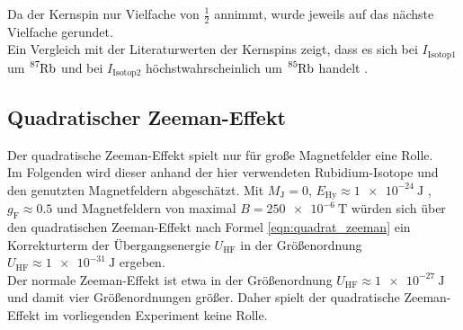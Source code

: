 Da der Kernspin nur Vielfache von $\frac{1}{2}$ annimmt, wurde jeweils auf das nächste Vielfache gerundet.\\
Ein Vergleich mit der Literaturwerten der Kernspins zeigt, dass es sich bei $I_{\mathrm{Isotop 1}}$ um $\ce{^87Rb}$ und bei $I_{\mathrm{Isotop 2}}$ höchstwahrscheinlich um $\ce{^85Rb}$ handelt \cite{muenster}.

\subsection{Quadratischer Zeeman-Effekt}
Der quadratische Zeeman-Effekt spielt nur für große Magnetfelder eine Rolle. \\
Im Folgenden wird dieser anhand der hier verwendeten Rubidium-Isotope und den genutzten Magnetfeldern abgeschätzt.
Mit $M_{\mathrm{J}}=0$, \Delta$E_{\mathrm{Hy}}\approx\SI{1e-24}{\joule}$ \cite{Anleitung}, $g_{\mathrm{F}}\approx 0.5$ und Magnetfeldern von maximal $B=\SI{250e-6}{\tesla}$ würden sich über den quadratischen Zeeman-Effekt nach Formel \eqref{eqn:quadrat_zeeman} ein Korrekturterm der Übergangsenergie $U_{\mathrm{HF}}$ in der Größenordnung $U_{\mathrm{HF}}\approx \SI{1e-31}{\joule}$ ergeben.\\
Der normale Zeeman-Effekt ist etwa in der Größenordnung $U_{\mathrm{HF}}\approx \SI{1e-27}{\joule}$ und damit vier Größenordnungen größer. Daher spielt der quadratische Zeeman-Effekt im vorliegenden Experiment keine Rolle.
